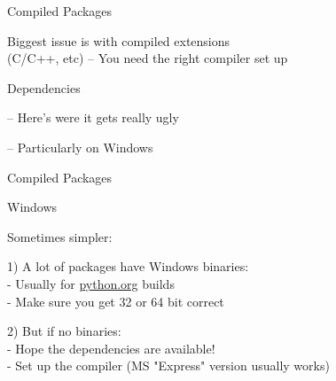 \documentclass{beamer}
\begin{document}
\begin{frame}[fragile]{Compiled Packages}

{\LARGE Biggest issue is with compiled extensions\\[0.1in]
\hfill(C/C++, etc)\hfill
}
\vfill
{\Large -- You need the right compiler set up}

\vfill
{\LARGE Dependencies}

\vfill
{\Large -- Here's were it gets really ugly}

\vfill
{\Large -- Particularly on Windows}

\end{frame} 


\begin{frame}[fragile]{Compiled Packages}

{\LARGE Windows}

\vfill
{\Large Sometimes simpler:}

\vfill
{\Large 1) A lot of packages have Windows binaries:\\[0.1in]
            - Usually for \url{python.org} builds \\[0.1in]
            - Make sure you get 32 or 64 bit correct
}

\vfill
{\Large 2) But if no binaries: \\[0.1in]
           - Hope the dependencies are available!\\[0.1in]
           - Set up the compiler (MS "Express" version usually works)
}

\end{frame} 
\end{document}
